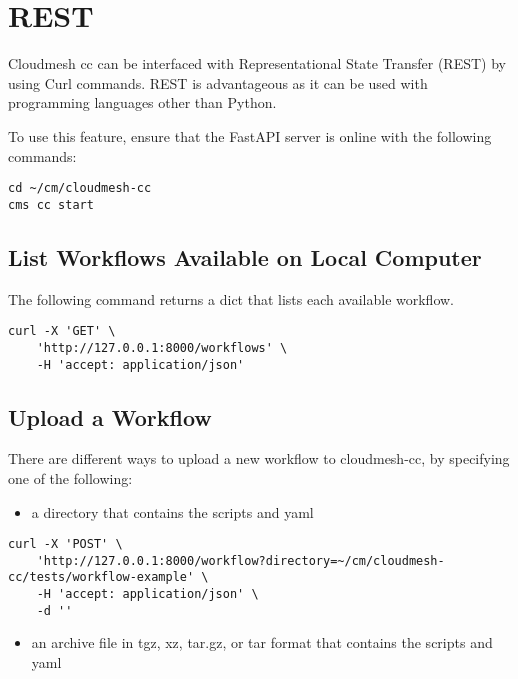 
\section{REST}\label{rest}

Cloudmesh cc can be interfaced with Representational State Transfer
(REST) by using Curl commands. REST is advantageous as it can be used
with programming languages other than Python.

To use this feature, ensure that the FastAPI server is online with the
following commands:

\begin{verbatim}
cd ~/cm/cloudmesh-cc
cms cc start
\end{verbatim}

\subsection{List Workflows Available on Local
Computer}\label{list-workflows-available-on-local-computer}

The following command returns a dict that lists each available workflow.

\begin{verbatim}
curl -X 'GET' \
    'http://127.0.0.1:8000/workflows' \
    -H 'accept: application/json'
\end{verbatim}

\subsection{Upload a Workflow}\label{upload-a-workflow}

There are different ways to upload a new workflow to cloudmesh-cc, by
specifying one of the following:

\begin{itemize}
\item
  a directory that contains the scripts and yaml
\end{itemize}

\begin{verbatim}
curl -X 'POST' \
    'http://127.0.0.1:8000/workflow?directory=~/cm/cloudmesh-cc/tests/workflow-example' \
    -H 'accept: application/json' \
    -d ''
\end{verbatim}

\begin{itemize}
\item
  an archive file in tgz, xz, tar.gz, or tar format that contains the
  scripts and yaml
\end{itemize}

